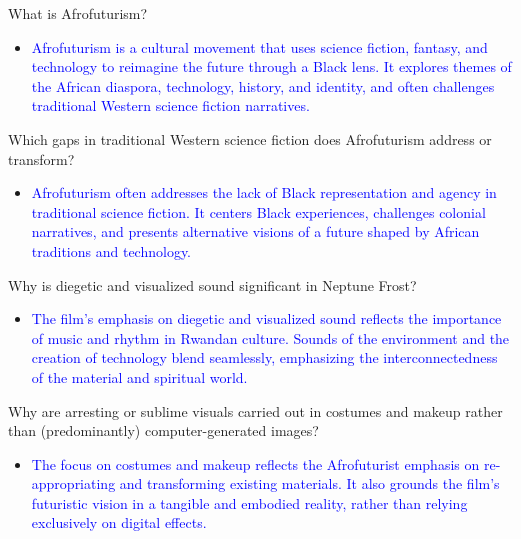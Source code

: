 \documentclass[11pt,fleqn]{book}
\begin{document}
\begin{exercise}
What is Afrofuturism?
\begin{itemize}
\item \textcolor{blue}{Afrofuturism is a cultural movement that uses science fiction, fantasy, and technology to reimagine the future  through a Black lens.  It  explores themes of the African diaspora, technology, history, and identity, and often challenges traditional Western science fiction narratives.}
\end{itemize}
\end{exercise}

\begin{exercise}
Which gaps in traditional Western science fiction does Afrofuturism address or transform?
\begin{itemize}
    \item \textcolor{blue}{Afrofuturism often addresses the lack of Black representation and agency in traditional science fiction. It centers Black experiences, challenges colonial narratives, and presents alternative visions of a future shaped by African traditions and technology.}
\end{itemize}
\end{exercise}

\begin{exercise}
Why is diegetic and visualized sound significant in Neptune Frost?
\begin{itemize}
    \item \textcolor{blue}{The film's emphasis on diegetic and visualized sound reflects the importance of music and rhythm in Rwandan culture. Sounds of the environment and the creation of technology blend seamlessly, emphasizing  the interconnectedness of the material and spiritual world.}
\end{itemize}
\end{exercise}

\begin{exercise}
Why are arresting or sublime visuals carried out in costumes and makeup rather than (predominantly) computer-generated images?
\begin{itemize}
    \item \textcolor{blue}{The focus on costumes and makeup reflects the Afrofuturist emphasis on re-appropriating and transforming existing materials. It also grounds the film's futuristic vision in a tangible and embodied reality, rather than relying exclusively on digital effects.}
\end{itemize}
\end{exercise}
\end{document}
